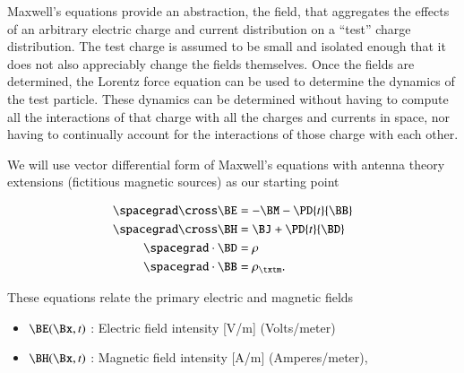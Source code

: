%
%
Maxwell's equations provide an abstraction, the field, that aggregates the effects of an arbitrary electric charge and current
distribution on a ``test'' charge distribution.
The test charge is assumed to be small and isolated enough that it does not also appreciably change the fields themselves.
Once the fields are determined, the Lorentz force equation can be used to determine the dynamics of the
test particle.
These dynamics can be determined without having to
compute all the interactions of that charge with all the charges and currents in space, nor having to continually account for
the interactions of those charge with each other.

We will use vector differential form of Maxwell's equations with antenna theory extensions (fictitious magnetic sources) as our starting point


\index{\(\BE\)}
\index{\(\BH\)}
\index{\(\BB\)}
\index{\(\BD\)}
\index{\(\BM\)}
\index{\(\BJ\)}
\index{\(\rho\)}
\index{\(\rho_\txtm\)}

\begin{dmath}\label{eqn:freespace:3399}
\begin{aligned}
\spacegrad \cross \BE &= - \BM - \PD{t}{\BB} \\
\spacegrad \cross \BH &= \BJ + \PD{t}{\BD} \\
\spacegrad \cdot \BD &= \rho \\
\spacegrad \cdot \BB &= \rho_\txtm.
\end{aligned}
\end{dmath}

These equations relate the primary electric and magnetic fields

\begin{itemize}
	\item \( \BE(\Bx, t) \) : Electric field intensity [\si{V/m}] (Volts/meter)
	\item \( \BH(\Bx, t) \) : Magnetic field intensity [\si{A/m}] (Amperes/meter),
\end{itemize}

